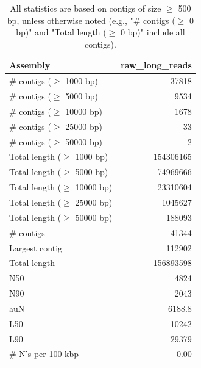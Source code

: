 \documentclass[12pt,a4paper]{article}
\begin{document}
\begin{table}[ht]
\begin{center}
\caption{All statistics are based on contigs of size $\geq$ 500 bp, unless otherwise noted (e.g., "\# contigs ($\geq$ 0 bp)" and "Total length ($\geq$ 0 bp)" include all contigs).}
\begin{tabular}{|l*{1}{|r}|}
\hline
Assembly & raw\_long\_reads \\ \hline
\# contigs ($\geq$ 1000 bp) & 37818 \\ \hline
\# contigs ($\geq$ 5000 bp) & 9534 \\ \hline
\# contigs ($\geq$ 10000 bp) & 1678 \\ \hline
\# contigs ($\geq$ 25000 bp) & 33 \\ \hline
\# contigs ($\geq$ 50000 bp) & 2 \\ \hline
Total length ($\geq$ 1000 bp) & 154306165 \\ \hline
Total length ($\geq$ 5000 bp) & 74969666 \\ \hline
Total length ($\geq$ 10000 bp) & 23310604 \\ \hline
Total length ($\geq$ 25000 bp) & 1045627 \\ \hline
Total length ($\geq$ 50000 bp) & 188093 \\ \hline
\# contigs & 41344 \\ \hline
Largest contig & 112902 \\ \hline
Total length & 156893598 \\ \hline
N50 & 4824 \\ \hline
N90 & 2043 \\ \hline
auN & 6188.8 \\ \hline
L50 & 10242 \\ \hline
L90 & 29379 \\ \hline
\# N's per 100 kbp & 0.00 \\ \hline
\end{tabular}
\end{center}
\end{table}
\end{document}
